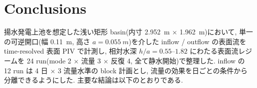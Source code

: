 
\section{Conclusions}
\label{sec:conclusions}

揚水発電上池を想定した浅い矩形 basin(内寸 \SI{2.952}{m} $\times$ \SI{1.962}{m})において, 単一の可逆開口(幅 \SI{0.11}{m}, 高さ $a=\SI{0.055}{m}$)を介した inflow / outflow の表面流を time-resolved 表面 PIV で計測し, 相対水深 $h/a = 0.55$--$1.82$ にわたる表面流レジームを 24 run(mode 2 $\times$ 流量 3 $\times$ 反復 4, 全て静水開始)で整理した. inflow の 12 run は 4 日 $\times$ 3 流量水準の block 計画とし, 流量の効果を日ごとの条件から分離できるようにした. 主要な結論は以下のとおりである.

